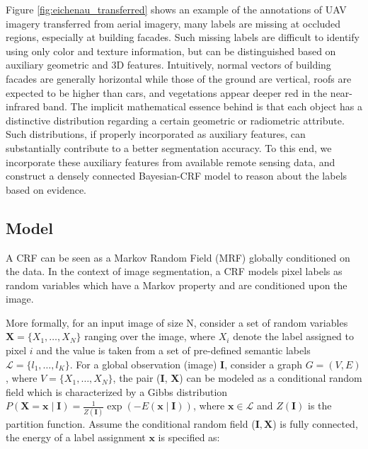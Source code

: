 Figure \ref{fig:eichenau_transferred} shows an example of the annotations of UAV imagery transferred from aerial imagery, many labels are missing at occluded regions, especially at building facades. Such missing labels are difficult to identify using only color and texture information, but can be distinguished based on auxiliary geometric and 3D features. Intuitively, normal vectors of building facades are generally horizontal while those of the ground are vertical, roofs are expected to be higher than cars, and vegetations appear deeper red in the near-infrared band. The implicit mathematical essence behind is that each object has a distinctive distribution regarding a certain geometric or radiometric attribute. Such distributions, if properly incorporated as auxiliary features, can substantially contribute to a better segmentation accuracy. To this end, we incorporate these auxiliary features from available remote sensing data, and construct a densely connected Bayesian-CRF model to reason about the labels based on evidence. 


\subsection{Model}
A CRF can be seen as a Markov Random Field (MRF) globally conditioned on the data. In the context of image segmentation, a CRF models pixel labels as random variables which have a Markov property and are conditioned upon the image.

More formally, for an input image of size N, consider a set of random variables $\mathbf{X} = \{X_1,\dots, X_N\}$ ranging over the image, where $X_i$ denote the label assigned to pixel $i$ and the value is taken from a set of pre-defined semantic labels $\mathcal{L} = \{l_1, \dots, l_K\}$. For a global observation (image) $\mathbf{I}$, consider a graph $G = \left(V, E\right)$, where $V = \{X_1,\dots, X_N\}$, the pair (\textbf{I}, \textbf{X}) can be modeled as a conditional random field which is characterized by a Gibbs distribution $P\left(\textbf{X}=\textbf{x} \mid \textbf{I}\right) = \frac{1}{Z\left(\textbf{I}\right)} \exp \left( - E\left(\textbf{x} \mid \textbf{I}\right)\right)$, where $\mathbf{x} \in \mathcal{L}$ and $Z\left(\textbf{I}\right)$ is the partition function. Assume the conditional random field ($\mathbf{I},\mathbf{X}$) is fully connected, the energy of a label assignment $\textbf{x}$ is specified as:

